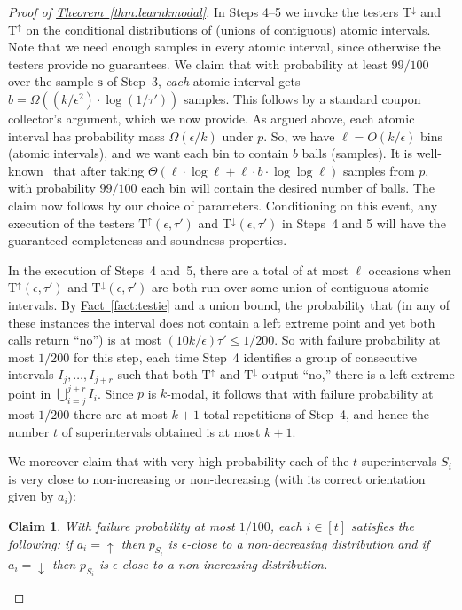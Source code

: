 \documentclass[10pt]{article}
\newtheorem{claim}[theorem]{Claim}
\theoremstyle{definition}
\numberwithin{equation}{section}
\newcommand{\expref}[2]{\texorpdfstring{\hyperref[#2]{#1~\ref{#2}}}{#1~\ref{#2}}}
\newcommand{\eps}{\epsilon}
\newcommand{\TND}{{\mathrm{T^{\uparrow}}}}
\newcommand{\TNI}{{\mathrm{T^{\downarrow}}}}
\begin{document}
\begin{proof}[Proof of \expref{Theorem}{thm:learnkmodal}]
In Steps 4--5 we invoke the testers $\TNI$ and $\TND$ on
the conditional distributions of (unions of contiguous) atomic intervals.
Note that we need enough samples in every atomic interval, since otherwise
the testers provide no guarantees. We claim that with probability at least
$99/100$ over the sample $\mathbf{s}$ of Step~3, \emph{each} atomic interval gets
$b = \Omega \left( {(k/\eps^2)} \cdot \log(1/\tau') \right)$ samples.
This follows by a standard coupon collector's argument, which we now provide.
As argued above, each atomic interval has probability mass $\Omega(\eps/k)$ under $p$.
So, we have $\ell = O(k/\eps)$ bins (atomic intervals), and we want each bin
to contain $b$ balls (samples). It is well-known~\cite{NS:60} that after taking
$\Theta(\ell \cdot \log \ell + \ell \cdot b \cdot \log \log \ell)$ samples from $p$,
with probability $99/100$ each bin will contain the desired number of balls.
The claim now follows by our choice of parameters. Conditioning on this event,
any execution of the testers $\TND(\eps,\tau')$ and $\TNI(\eps,\tau')$ 
in Steps~4 and 5 will have the guaranteed completeness and soundness properties.

In the execution of Steps~4 and~5, there are a total of at most
$\ell$ occasions when $\TND(\eps,\tau')$ and $\TNI(\eps,\tau')$
are both run over some union of contiguous atomic intervals.
By \expref{Fact}{fact:testie} and a union bound,
the probability that (in any of these instances the interval does not
contain a left extreme point and yet both calls return ``no'') is at
most $(10k/\eps)\tau' \leq 1/200$.  So with failure probability at most $1/200$ for this
step, each time Step~4 identifies a group of
consecutive intervals $I_{j},\dots,I_{j+r}$ such that both $\TND$ and
$\TNI$ output ``no,'' there is a left extreme point in $\bigcup_{i=j}^{j+r} I_i$.
Since $p$ is $k$-modal, it follows that with failure probability at
most $1/200$ there are at most $k+1$ total repetitions of
Step~4, and hence the number $t$ of superintervals obtained is at most $k+1$.

We moreover claim that with very high probability each of the $t$
superintervals $S_i$ is very close to non-increasing or non-decreasing (with
its correct orientation given by $a_i$):
%
\begin{claim} \label{claim:Siisright}
With failure probability at most $1/100$, each $i \in [t]$ satisfies the
following:  if $a_i=\uparrow$ then $p_{S_i}$ is $\eps$-close to a non-decreasing
distribution and if $a_i=\downarrow$ then $p_{S_i}$ is $\eps$-close to a non-increasing
distribution.
\end{claim}


\end{proof}
\end{document}
